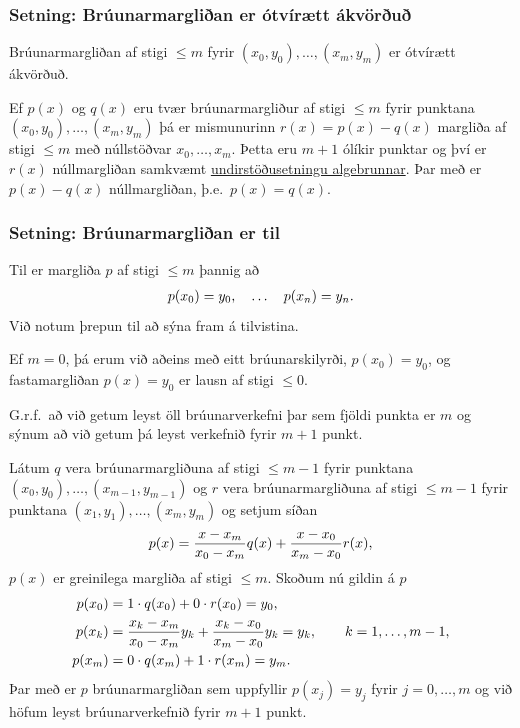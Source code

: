 \documentclass[a4paper,10pt,icelandic]{sphinxmanual}
\begin{document}
\subsubsection{Setning: Brúunarmargliðan er ótvírætt ákvörðuð}
\label{kafli03:setning-bruunarmarglian-er-otviraett-akvoru}
Brúunarmargliðan af stigi \(\leq m\) fyrir \((x_0,y_0),\ldots,(x_m,y_m)\) er
ótvírætt ákvörðuð.

Ef \(p(x)\) og \(q(x)\) eru tvær
brúunarmargliður af stigi \(\leq m\) fyrir punktana
\((x_0,y_0), \ldots, (x_m,y_m)\) þá er mismunurinn
\(r(x) = p(x) - q(x)\) margliða af stigi \(\leq m\) með
núllstöðvar \(x_0, \ldots, x_m\). Þetta eru \(m+1\) ólíkir
punktar og því er \(r(x)\) núllmargliðan samkvæmt
\href{http://www.stae.is/fletta/undirst\%C3\%B6\%C3\%B0usetning/algebrunnar}{undirstöðusetningu algebrunnar}.
Þar með er \(p(x) - q(x)\) núllmargliðan, þ.e. \(p(x) = q(x)\).


\subsubsection{Setning: Brúunarmargliðan er til}
\label{kafli03:setning-bruunarmarglian-er-til}
Til er margliða \(p\) af stigi \(\leq m\) þannig að
\begin{gather}
\begin{split}p(x_0) = y_0, \quad \ldots \quad p(x_n)=y_n.\end{split}\notag
\end{gather}
Við notum þrepun til að sýna fram á tilvistina.

Ef \(m = 0\), þá erum við aðeins með eitt brúunarskilyrði,
\(p(x_0) = y_0\), og fastamargliðan \(p(x) = y_0\) er lausn af
stigi \(\leq 0\).

G.r.f. að við getum leyst öll brúunarverkefni þar sem fjöldi punkta er
\(m\) og sýnum að við getum þá leyst verkefnið fyrir \(m+1\)
punkt.

Látum \(q\) vera brúunarmargliðuna af stigi \(\leq m-1\) fyrir
punktana \((x_0,y_0), \ldots,
(x_{m-1},y_{m-1})\) og \(r\) vera brúunarmargliðuna af stigi
\(\leq m-1\) fyrir punktana \((x_1,y_1), \ldots, (x_m,y_m)\) og
setjum síðan
\begin{gather}
\begin{split}p(x) = \frac{x-x_m}{x_0-x_m}q(x) + \frac{x-x_0}{x_m-x_0}r(x),\end{split}\notag
\end{gather}
\(p(x)\) er greinilega margliða af stigi \(\leq m\). Skoðum nú
gildin á \(p\)
\begin{gather}
\begin{split}\begin{aligned}
  p(x_0) &= 1 \cdot q(x_0) + 0\cdot r(x_0) = y_0, \\
  p(x_k) &= \frac{x_k-x_m}{x_0-x_m}y_k
  + \frac{x_k-x_0}{x_m-x_0}y_k = y_k,\qquad k = 1, \ldots, m-1,\\
  p(x_m) &= 0 \cdot q(x_m) + 1 \cdot r(x_m) = y_m.\end{aligned}\end{split}\notag
\end{gather}
Þar með er \(p\) brúunarmargliðan sem uppfyllir \(p(x_j)=y_j\)
fyrir \(j=0,\dots,m\) og við höfum leyst brúunarverkefnið fyrir
\(m+1\) punkt.
\end{document}
